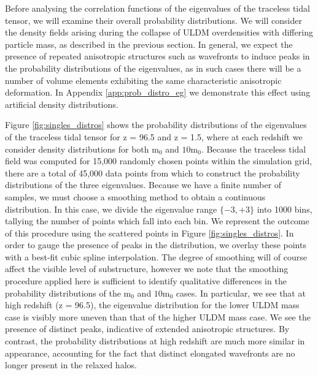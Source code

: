 \documentclass[a4paper,11pt]{article}
\begin{document}
Before analysing the correlation functions of the eigenvalues of the traceless tidal tensor, we will examine their overall probability distributions. We will consider the density fields arising during the collapse of ULDM overdensities with differing particle mass, as described in the previous section. In general, we expect the presence of repeated anisotropic structures such as wavefronts to induce peaks in the probability distributions of the eigenvalues, as in such cases there will be a number of volume elements exhibiting the same characteristic anisotropic deformation. In Appendix \ref{app:prob_distro_eg} we demonstrate this effect using artificial density distributions. 

Figure \ref{fig:singles_distros} shows the probability distributions of the eigenvalues of the traceless tidal tensor for z = 96.5 and z = 1.5, where at each redshift we consider density distributions for both $\mathrm{m}_0$ and $\mathrm{10m}_0$. Because the traceless tidal field was computed for 15,000 randomly chosen points within the simulation grid, there are a total of 45,000 data points from which to construct the probability distributions of the three eigenvalues. Because we have a finite number of samples, we must choose a smoothing method to obtain a continuous distribution. In this case, we divide the eigenvalue range $\{-3,+3\}$ into 1000 bins, tallying the number of points which fall into each bin. We represent the outcome of this procedure using the scattered points in Figure \ref{fig:singles_distros}. In order to gauge the presence of peaks in the distribution, we overlay these points with a best-fit cubic spline interpolation. The degree of smoothing will of course affect the visible level of substructure, however we note that the smoothing procedure applied here is sufficient to identify qualitative differences in the probability distributions of the $\mathrm{m}_0$ and $\mathrm{10m}_0$ cases. In particular, we see that at high redshift (z = 96.5), the eigenvalue distribution for the lower ULDM mass case is visibly more uneven than that of the higher ULDM mass case. We see the presence of distinct peaks, indicative of extended anisotropic structures. By contrast, the probability distributions at high redshift are much more similar in appearance, accounting for the fact that distinct elongated wavefronts are no longer present in the relaxed halos. 
\end{document}
